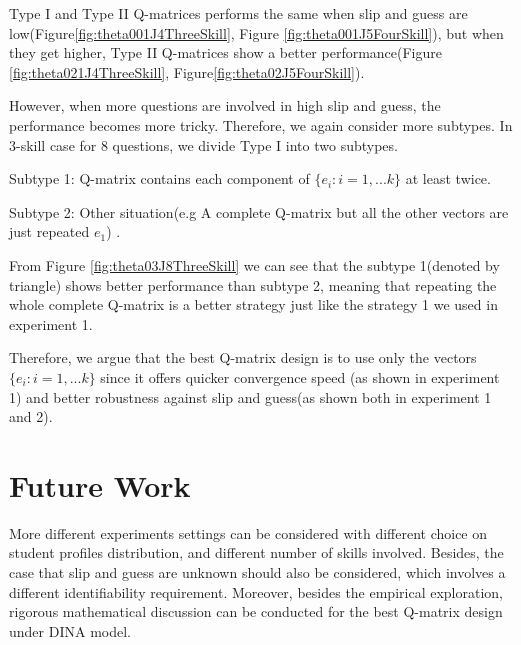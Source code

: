 \documentclass{edm_template}
\begin{document}
Type I and Type II Q-matrices performs the same when slip and guess are low(Figure\ref{fig:theta001J4ThreeSkill}, Figure \ref{fig:theta001J5FourSkill}), but when they get higher, Type II Q-matrices show a better performance(Figure \ref{fig:theta021J4ThreeSkill}, Figure\ref{fig:theta02J5FourSkill}).

However, when more questions are involved in high slip and guess, the performance becomes more tricky. Therefore, we again consider more subtypes. In 3-skill case for 8 questions, we divide Type I into two subtypes. 

Subtype 1: Q-matrix contains each component of $\{e_{i}:i=1,...k\}$ at least twice. 

Subtype 2: Other situation(e.g A complete Q-matrix but all the other vectors are just repeated $e_1$)
.

From Figure \ref{fig:theta03J8ThreeSkill} we can see that the subtype 1(denoted by triangle) shows better performance than subtype 2, meaning that repeating the whole complete Q-matrix is a better strategy just like the strategy 1 we used in experiment 1.

Therefore, we argue that the best Q-matrix design is to use only the vectors $\{e_{i}:i=1,...k\}$ since it offers quicker convergence speed (as shown in experiment 1) and better robustness against slip and guess(as shown both in experiment 1 and 2).

\section{Future Work}
More different experiments settings can be considered with different choice on student profiles distribution, and different number of skills involved. Besides, the case that slip and guess are unknown should also be considered, which involves a different identifiability requirement\cite{xu2015identifiability}. Moreover, besides the empirical exploration, rigorous mathematical discussion can be conducted for the best Q-matrix design under DINA model. 


\end{document}
